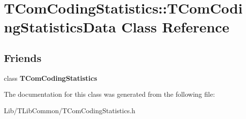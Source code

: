 \hypertarget{class_t_com_coding_statistics_1_1_t_com_coding_statistics_data}{}\section{T\+Com\+Coding\+Statistics\+:\+:T\+Com\+Coding\+Statistics\+Data Class Reference}
\label{class_t_com_coding_statistics_1_1_t_com_coding_statistics_data}
\subsection*{Friends}
\begin{DoxyCompactItemize}
\item 
\mbox{\label{class_t_com_coding_statistics_1_1_t_com_coding_statistics_data_a77955ce0b9c4d9a343f7c7a9b6ce9e2a}} 
class {\bfseries T\+Com\+Coding\+Statistics}
\end{DoxyCompactItemize}


The documentation for this class was generated from the following file\+:\begin{DoxyCompactItemize}
\item 
Lib/\+T\+Lib\+Common/T\+Com\+Coding\+Statistics.\+h\end{DoxyCompactItemize}
